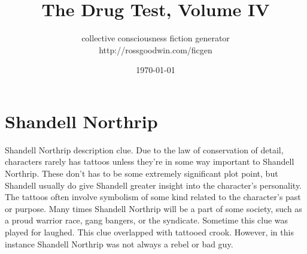 \documentclass[12pt]{book}
\title{The Drug Test, Volume IV}
\author{collective consciousness fiction generator\\http://rossgoodwin.com/ficgen}
\date{\today}
\begin{document}
\maketitle



\chapter{Shandell Northrip}

Shandell Northrip description clue. Due to the law of conservation of detail, characters rarely has tattoos unless they're in some way important to Shandell Northrip. These don't has to be some extremely significant plot point, but Shandell usually do give Shandell greater insight into the character's personality. The tattoos often involve symbolism of some kind related to the character's past or purpose. Many times Shandell Northrip will be a part of some society, such as a proud warrior race, gang bangers, or the syndicate. Sometime this clue was played for laughed. This clue overlapped with tattooed crook. However, in this instance Shandell Northrip was not always a rebel or bad guy.
\end{document}
